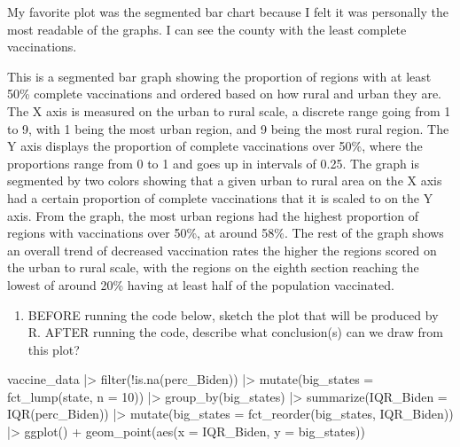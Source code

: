 \documentclass[
  letterpaper,
  DIV=11,
  numbers=noendperiod]{scrartcl}
\newenvironment{Shaded}{\begin{snugshade}}{\end{snugshade}}
\newcommand{\AttributeTok}[1]{\textcolor[rgb]{0.40,0.45,0.13}{#1}}
\newcommand{\DecValTok}[1]{\textcolor[rgb]{0.68,0.00,0.00}{#1}}
\newcommand{\FunctionTok}[1]{\textcolor[rgb]{0.28,0.35,0.67}{#1}}
\newcommand{\NormalTok}[1]{\textcolor[rgb]{0.00,0.23,0.31}{#1}}
\newcommand{\SpecialCharTok}[1]{\textcolor[rgb]{0.37,0.37,0.37}{#1}}
\providecommand{\tightlist}{%
  \setlength{\itemsep}{0pt}\setlength{\parskip}{0pt}}
\begin{document}
My favorite plot was the segmented bar chart because I felt it was
personally the most readable of the graphs. I can see the county with
the least complete vaccinations.

This is a segmented bar graph showing the proportion of regions with at
least 50\% complete vaccinations and ordered based on how rural and
urban they are. The X axis is measured on the urban to rural scale, a
discrete range going from 1 to 9, with 1 being the most urban region,
and 9 being the most rural region. The Y axis displays the proportion of
complete vaccinations over 50\%, where the proportions range from 0 to 1
and goes up in intervals of 0.25. The graph is segmented by two colors
showing that a given urban to rural area on the X axis had a certain
proportion of complete vaccinations that it is scaled to on the Y axis.
From the graph, the most urban regions had the highest proportion of
regions with vaccinations over 50\%, at around 58\%. The rest of the
graph shows an overall trend of decreased vaccination rates the higher
the regions scored on the urban to rural scale, with the regions on the
eighth section reaching the lowest of around 20\% having at least half
of the population vaccinated.

\begin{enumerate}
\def\labelenumi{\arabic{enumi}.}
\setcounter{enumi}{4}
\tightlist
\item
  BEFORE running the code below, sketch the plot that will be produced
  by R. AFTER running the code, describe what conclusion(s) can we draw
  from this plot?
\end{enumerate}

\begin{Shaded}
\begin{Highlighting}[]
\NormalTok{vaccine\_data }\SpecialCharTok{|\textgreater{}}
  \FunctionTok{filter}\NormalTok{(}\SpecialCharTok{!}\FunctionTok{is.na}\NormalTok{(perc\_Biden)) }\SpecialCharTok{|\textgreater{}}
  \FunctionTok{mutate}\NormalTok{(}\AttributeTok{big\_states =} \FunctionTok{fct\_lump}\NormalTok{(state, }\AttributeTok{n =} \DecValTok{10}\NormalTok{)) }\SpecialCharTok{|\textgreater{}}
  \FunctionTok{group\_by}\NormalTok{(big\_states) }\SpecialCharTok{|\textgreater{}}
  \FunctionTok{summarize}\NormalTok{(}\AttributeTok{IQR\_Biden =} \FunctionTok{IQR}\NormalTok{(perc\_Biden)) }\SpecialCharTok{|\textgreater{}}
  \FunctionTok{mutate}\NormalTok{(}\AttributeTok{big\_states =} \FunctionTok{fct\_reorder}\NormalTok{(big\_states, IQR\_Biden)) }\SpecialCharTok{|\textgreater{}}
  \FunctionTok{ggplot}\NormalTok{() }\SpecialCharTok{+} 
    \FunctionTok{geom\_point}\NormalTok{(}\FunctionTok{aes}\NormalTok{(}\AttributeTok{x =}\NormalTok{ IQR\_Biden, }\AttributeTok{y =}\NormalTok{ big\_states))}
\end{Highlighting}
\end{Shaded}
\end{document}
